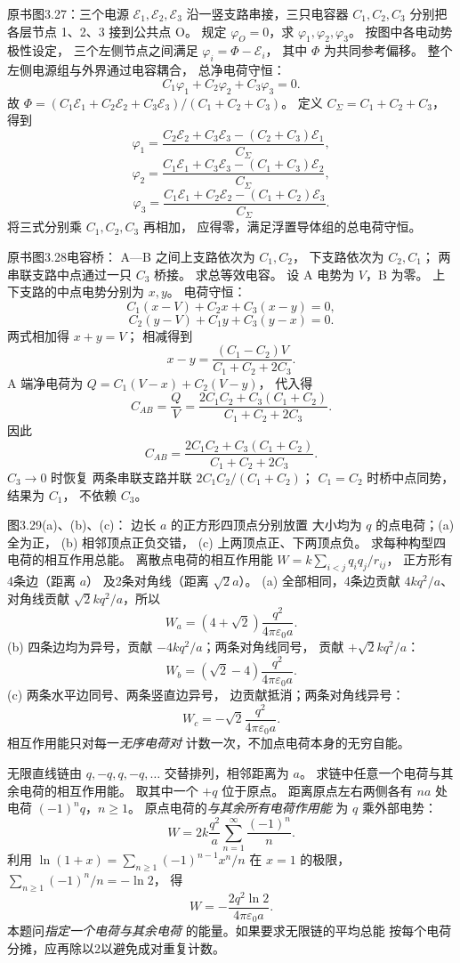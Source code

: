 原书图3.27：三个电源
$\mathcal E_1,\mathcal E_2,\mathcal E_3$
沿一竖支路串接，三只电容器
$C_1,C_2,C_3$ 分别把各层节点
1、2、3 接到公共点 O。
规定 $\varphi_O=0$，求
$\varphi_1,\varphi_2,\varphi_3$。
\exsolution
按图中各电动势极性设定，
三个左侧节点之间满足
$\varphi_i=\Phi-\mathcal E_i$，
其中 $\Phi$ 为共同参考偏移。
整个左侧电源组与外界通过电容耦合，
总净电荷守恒：
\[
C_1\varphi_1+C_2\varphi_2+C_3\varphi_3=0.
\]
故
$\Phi=(C_1\mathcal E_1+C_2\mathcal E_2+
C_3\mathcal E_3)/(C_1+C_2+C_3)$。
定义 $C_\Sigma=C_1+C_2+C_3$，得到
\[
\boxed{\varphi_1=
\frac{C_2\mathcal E_2+C_3\mathcal E_3-
(C_2+C_3)\mathcal E_1}{C_\Sigma}},
\]
\[
\boxed{\varphi_2=
\frac{C_1\mathcal E_1+C_3\mathcal E_3-
(C_1+C_3)\mathcal E_2}{C_\Sigma}},
\]
\[
\boxed{\varphi_3=
\frac{C_1\mathcal E_1+C_2\mathcal E_2-
(C_1+C_2)\mathcal E_3}{C_\Sigma}}.
\]
\excheck 将三式分别乘 $C_1,C_2,C_3$ 再相加，
应得零，满足浮置导体组的总电荷守恒。

原书图3.28电容桥：
A—B 之间上支路依次为 $C_1,C_2$，
下支路依次为 $C_2,C_1$；
两串联支路中点通过一只 $C_3$ 桥接。
求总等效电容。
\exsolution
设 A 电势为 $V$，B 为零。
上下支路的中点电势分别为 $x,y$。
电荷守恒：
\[
C_1(x-V)+C_2x+C_3(x-y)=0,
\]
\[
C_2(y-V)+C_1y+C_3(y-x)=0.
\]
两式相加得 $x+y=V$；
相减得到
\[
x-y=\frac{(C_1-C_2)V}{C_1+C_2+2C_3}.
\]
A 端净电荷为
$Q=C_1(V-x)+C_2(V-y)$，
代入得
\[
C_{AB}=\frac QV
=\frac{2C_1C_2+C_3(C_1+C_2)}
{C_1+C_2+2C_3}.
\]
因此
\[
\boxed{C_{AB}=
\frac{2C_1C_2+C_3(C_1+C_2)}
{C_1+C_2+2C_3}}.
\]
\excheck $C_3\to0$ 时恢复
两条串联支路并联
$2C_1C_2/(C_1+C_2)$；
$C_1=C_2$ 时桥中点同势，结果为 $C_1$，
不依赖 $C_3$。

图3.29(a)、(b)、(c)：
边长 $a$ 的正方形四顶点分别放置
大小均为 $q$ 的点电荷；(a) 全为正，
(b) 相邻顶点正负交错，
(c) 上两顶点正、下两顶点负。
求每种构型四电荷的相互作用总能。
\exsolution
离散点电荷的相互作用能
$W=k\sum_{i<j}q_iq_j/r_{ij}$，
正方形有4条边（距离 $a$）
及2条对角线（距离 $\sqrt2a$）。
(a) 全部相同，4条边贡献
$4kq^2/a$、对角线贡献
$\sqrt2kq^2/a$，所以
\[
\boxed{W_a=(4+\sqrt2)\frac{q^2}
{4\pi\varepsilon_0a}}.
\]
(b) 四条边均为异号，贡献
$-4kq^2/a$；两条对角线同号，
贡献 $+\sqrt2kq^2/a$：
\[
\boxed{W_b=(\sqrt2-4)\frac{q^2}
{4\pi\varepsilon_0a}}.
\]
(c) 两条水平边同号、两条竖直边异号，
边贡献抵消；两条对角线异号：
\[
\boxed{W_c=-\sqrt2\frac{q^2}
{4\pi\varepsilon_0a}}.
\]
\excheck 相互作用能只对每一\emph{无序电荷对}
计数一次，不加点电荷本身的无穷自能。

无限直线链由 $q,-q,q,-q,\ldots$
交替排列，相邻距离为 $a$。
求链中任意一个电荷与其余电荷的相互作用能。
\exsolution
取其中一个 $+q$ 位于原点。
距离原点左右两侧各有
$n a$ 处电荷 $(-1)^nq$，$n\ge1$。
原点电荷的\emph{与其余所有电荷作用能}
为 $q$ 乘外部电势：
\[
W=2k\frac{q^2}{a}
\sum_{n=1}^\infty\frac{(-1)^n}{n}.
\]
利用
$\ln(1+x)=\sum_{n\ge1}(-1)^{n-1}x^n/n$
在 $x=1$ 的极限，
$\sum_{n\ge1}(-1)^n/n=-\ln2$，
得
\[
\boxed{W=-\frac{2q^2\ln2}
{4\pi\varepsilon_0a}}.
\]
\excheck 本题问\emph{指定一个电荷与其余电荷}
的能量。如果要求无限链的平均总能
按每个电荷分摊，应再除以2以避免成对重复计数。

